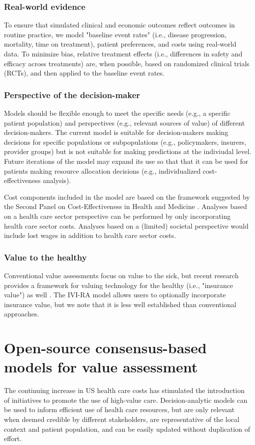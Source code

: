 \documentclass[11pt,final,fleqn]{article}\usepackage[]{graphicx}\usepackage[]{color}
\theoremstyle{plain}
\begin{document}
\subsubsection*{Real-world evidence}
To ensure that simulated clinical and economic outcomes reflect outcomes in routine practice, we model "baseline event rates" (i.e., disease progression, mortality, time on treatment), patient preferences, and costs using real-world data. To minimize bias, relative treatment effects (i.e., differences in safety and efficacy across treatments) are, when possible, based on randomized clinical trials (RCTs), and then applied to the baseline event rates.

\subsubsection*{Perspective of the decision-maker}
Models should be flexible enough to meet the specific needs (e.g., a specific patient population) and perspectives (e.g., relevant sources of value) of different decision-makers. The current model is suitable for decision-makers making decisions for specific populations or subpopulations (e.g., policymakers, insurers, provider groups) but is not suitable for making predictions at the indiviudal level. Future iterations of the model may expand its use so that that it can be used for patients making resource allocation decisions (e.g., individualized cost-effectiveness analysis). 

Cost components included in the model are based on the framework suggested by the Second Panel on Cost-Effectiveness in Health and Medicine \citep{sanders2016recommendations}. Analyses based on a health care sector perspective can be performed by only incorporating health care sector costs. Analyses based on a (limited) societal perspective would include lost wages in addition to health care sector costs. 

\subsubsection*{Value to the healthy}
Conventional value assessments focus on value to the sick, but recent research provides a framework for valuing technology for the healthy (i.e., "insurance value") as well \citet{lakdawalla2017insurance}. The IVI-RA model allows users to optionally incorporate insurance value, but we note that it is less well established than conventional approaches. 

\clearpage
\section{Open-source consensus-based models for value assessment}\label{sec:osvp}
The continuing increase in US health care costs has stimulated the introduction of initiatives to promote the use of high-value care. Decision-analytic models can be used to inform efficient use of health care resources, but are only relevant when deemed credible by different stakeholders, are representative of the local context and patient population, and can be easily updated without duplication of effort.
\end{document}
